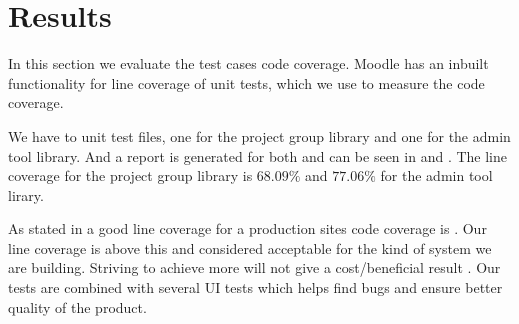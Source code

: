 \section{Results}
\label{sec:results}

In this section we evaluate the test cases code coverage. 
Moodle has an inbuilt functionality for line coverage of unit tests, which we use to measure the code coverage.

We have to unit test files, one for the project group library and one for the admin tool library. 
And a report is generated for both and can be seen in  and .
The line coverage for the project group library is $68.09\%$ and $77.06\%$ for the admin tool lirary.

As stated in  a good line coverage for a production sites code coverage is \idealCC{}.
Our line coverage is above this and considered acceptable for the kind of system we are building. 
Striving to achieve more will not give a cost/beneficial result . 
Our tests are combined with several UI tests which helps find bugs and ensure better quality of the product. 